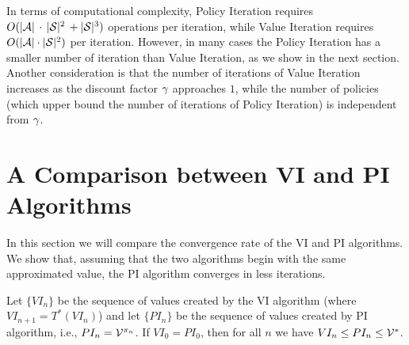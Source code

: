 In terms of computational complexity, Policy Iteration requires
$O(|\mathcal{A}|\, \cdot \,|\mathcal{S}|^2\, + |\mathcal{S}|^3)$ operations per
iteration, while Value Iteration requires $O(|\mathcal{A}| \cdot
|\mathcal{S}|^2)$ per iteration.
%
However, in many cases the Policy Iteration has a smaller number of
iteration  than Value Iteration, as we show in the next section.
%
Another consideration is that the number of iterations of Value
Iteration increases as the discount factor $\gamma $ approaches
$1$, while the number of policies (which upper bound the number of
iterations of Policy Iteration) is independent from $\gamma$.


\section{A Comparison between VI and PI Algorithms}

In this section we will compare the convergence rate of the VI and
PI algorithms. We show that, assuming that the two algorithms begin
with the same approximated value, the PI algorithm converges in less
iterations.
\begin{theorem}
\label{L6:PIVI-ComparisonTh} Let $\{VI_{n}\}$ be the sequence of
values created by the VI algorithm (where $VI_{n+1}=T^*(VI_{n})$)
and let $\{PI_{n}\}$ be the sequence of values created by PI
algorithm, i.e., $PI_n=\mathcal{V}^{\pi_n}$. If $VI_{0}=PI_{0}$, then
for all $ n$ we have $ VI_{n}\leq PI_{n}\leq \mathcal{V}^*$.
\end{theorem}

